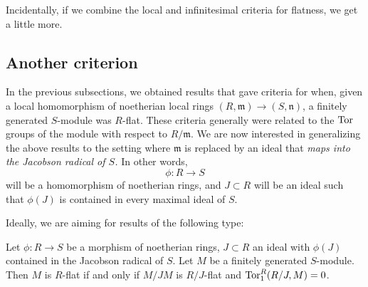 Incidentally, if we combine the local and infinitesimal criteria for flatness, we get a little more.

\begin{comment}
\subsection{The $\gr$ criterion for flatness}

Suppose $(R, \mathfrak{m})$ is a noetherian local ring and $(S, \mathfrak{n})$
a local $R$-algebra.
As usual, we are interested in criteria for when a finitely generated
$S$-module $M$ is flat over $R$.

We can, of course, endow $M$ with the $\mathfrak{m}$-adic topology. 
Then $M$ is a filtered module over the filtered ring $R$ (with the
$\mathfrak{m}$-adic topology).
We have morphisms for each $i$,
\[ \mathfrak{m}^i/\mathfrak{m}^{i +1} \otimes_{R/\mathfrak{m}}
M/\mathfrak{m}M \to \mathfrak{m}^i M/\mathfrak{m}^{i+1} M  \]
that induce map
\[ \gr(R) \otimes_{R/\mathfrak{m}}  M/\mathfrak{m}M \to \gr(M). \]

If $M$ is flat over 
\end{comment}

\subsection{Another criterion}
In the previous subsections, we obtained results that gave criteria for when,
given a local homomorphism of noetherian local rings $(R, \mathfrak{m}) \to
(S, \mathfrak{n})$, a finitely generated $S$-module was $R$-flat. 
These criteria generally were related to the $\operatorname{Tor}$ groups of the module with
respect to $R/\mathfrak{m}$.
We are now interested in generalizing the above results to the setting where
$\mathfrak{m}$ is replaced by an ideal that \emph{maps into the Jacobson radical of $S$.}
In other words, 
\[ \phi: R \to S  \]
will be a homomorphism of noetherian rings, and $J \subset R$ will be an ideal
such that $\phi(J)$ is contained in every maximal ideal of $S$. 

Ideally, we are aiming for results of the following type:
\begin{theorem} \label{localcritg}
Let $\phi: R \to S$ be a morphism of noetherian rings, $J \subset R$ an ideal
with $\phi(J) $ contained in the Jacobson radical of $S$.
Let $M$ be a finitely generated $S$-module. Then $M$ is $R$-flat if and only if
$M /JM$ is $R/J$-flat and $\operatorname{Tor}_1^R(R/J, M) = 0$.
\end{theorem} 

